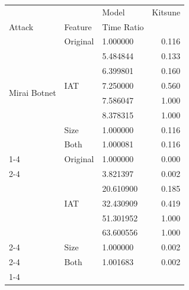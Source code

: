 \begin{tabular}{lllr}
\toprule
 &  & Model & Kitsune \\
Attack & Feature & Time Ratio &  \\
\midrule
\multirow[t]{8}{*}{Mirai Botnet} & Original & 1.000000 & 0.116 \\
\cline{2-4}
 & \multirow[t]{5}{*}{IAT} & 5.484844 & 0.133 \\
 &  & 6.399801 & 0.160 \\
 &  & 7.250000 & 0.560 \\
 &  & 7.586047 & 1.000 \\
 &  & 8.378315 & 1.000 \\
\cline{2-4}
 & Size & 1.000000 & 0.116 \\
\cline{2-4}
 & Both & 1.000081 & 0.116 \\
\cline{1-4} \cline{2-4}
\multirow[t]{8}{*}{SSDP Flood} & Original & 1.000000 & 0.000 \\
\cline{2-4}
 & \multirow[t]{5}{*}{IAT} & 3.821397 & 0.002 \\
 &  & 20.610900 & 0.185 \\
 &  & 32.430909 & 0.419 \\
 &  & 51.301952 & 1.000 \\
 &  & 63.600556 & 1.000 \\
\cline{2-4}
 & Size & 1.000000 & 0.002 \\
\cline{2-4}
 & Both & 1.001683 & 0.002 \\
\cline{1-4} \cline{2-4}
\bottomrule
\end{tabular}

